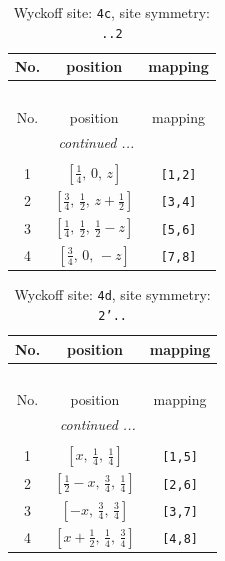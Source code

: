 \documentclass[fleqn,8pt]{jsarticle}
\begin{document}
\renewcommand{\arraystretch}{1.2}
\begin{longtable}{ccc}
\caption{Wyckoff site: {\tt 4c}, site symmetry: {\tt ..2}}
 \\
 \hline \hline
No. & position & mapping \\ \hline \endfirsthead

\multicolumn{2}{l}{\tablename\ \thetable{}} \\
 \hline \hline
No. & position & mapping \\ \hline \endhead

 \hline \hline
\multicolumn{2}{r}{\footnotesize\it continued ...} \\ \endfoot

 \hline \hline
\multicolumn{2}{r}{} \\ \endlastfoot

1 & $\left[ \frac{1}{4},\, 0,\, z \right]$ & {\tt [1,2]} \\ \hline
2 & $\left[ \frac{3}{4},\, \frac{1}{2},\, z + \frac{1}{2} \right]$ & {\tt [3,4]} \\ \hline
3 & $\left[ \frac{1}{4},\, \frac{1}{2},\, \frac{1}{2} - z \right]$ & {\tt [5,6]} \\ \hline
4 & $\left[ \frac{3}{4},\, 0,\, - z \right]$ & {\tt [7,8]} \\
\end{longtable}
\renewcommand{\arraystretch}{1.2}
\begin{longtable}{ccc}
\caption{Wyckoff site: {\tt 4d}, site symmetry: {\tt 2'..}}
 \\
 \hline \hline
No. & position & mapping \\ \hline \endfirsthead

\multicolumn{2}{l}{\tablename\ \thetable{}} \\
 \hline \hline
No. & position & mapping \\ \hline \endhead

 \hline \hline
\multicolumn{2}{r}{\footnotesize\it continued ...} \\ \endfoot

 \hline \hline
\multicolumn{2}{r}{} \\ \endlastfoot

1 & $\left[ x,\, \frac{1}{4},\, \frac{1}{4} \right]$ & {\tt [1,5]} \\ \hline
2 & $\left[ \frac{1}{2} - x,\, \frac{3}{4},\, \frac{1}{4} \right]$ & {\tt [2,6]} \\ \hline
3 & $\left[ - x,\, \frac{3}{4},\, \frac{3}{4} \right]$ & {\tt [3,7]} \\ \hline
4 & $\left[ x + \frac{1}{2},\, \frac{1}{4},\, \frac{3}{4} \right]$ & {\tt [4,8]} \\
\end{longtable}
\end{document}
